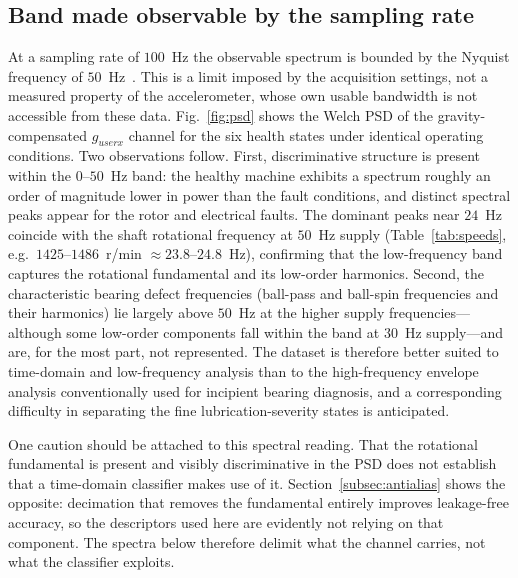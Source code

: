 \subsection{Band made observable by the sampling rate}
At a sampling rate of $100$~Hz the observable spectrum is bounded by the Nyquist
frequency of $50$~Hz~\cite{nyquist1924certain}. This is a limit imposed by the
acquisition settings, not a measured property of the accelerometer, whose own
usable bandwidth is not accessible from these data.
Fig.~\ref{fig:psd} shows the Welch PSD of the gravity-compensated $g_{userx}$
channel for the six health states under identical operating conditions. Two
observations follow. First, discriminative structure is present within the
$0$--$50$~Hz band: the healthy machine exhibits a spectrum roughly an order of
magnitude lower in power than the fault conditions, and distinct spectral peaks
appear for the rotor and electrical faults. The dominant peaks near $24$~Hz
coincide with the shaft rotational frequency at $50$~Hz supply
(Table~\ref{tab:speeds}, e.g.\ $1425$--$1486$~r/min $\approx 23.8$--$24.8$~Hz),
confirming that the low-frequency band captures the rotational fundamental and
its low-order harmonics. Second, the characteristic bearing defect frequencies
(ball-pass and ball-spin frequencies and their harmonics) lie largely above
$50$~Hz at the higher supply frequencies---although some low-order components fall
within the band at $30$~Hz supply---and are, for the most part, not represented.
The dataset is therefore better suited to time-domain and low-frequency analysis
than to the high-frequency envelope analysis conventionally used for incipient
bearing diagnosis, and a corresponding difficulty in separating the fine
lubrication-severity states is anticipated.

One caution should be attached to this spectral reading. That the rotational
fundamental is present and visibly discriminative in the PSD does not establish
that a time-domain classifier makes use of it. Section~\ref{subsec:antialias}
shows the opposite: decimation that removes the fundamental entirely improves
leakage-free accuracy, so the descriptors used here are evidently not relying on
that component. The spectra below therefore delimit what the channel carries, not
what the classifier exploits.

